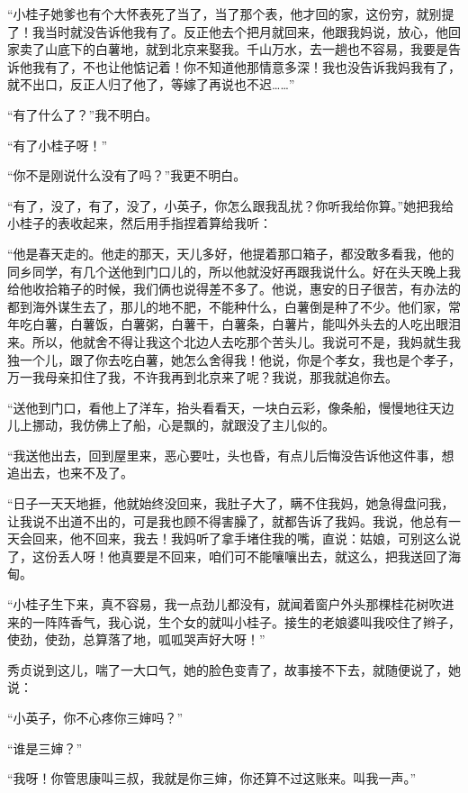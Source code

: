 \par “小桂子她爹也有个大怀表死了当了，当了那个表，他才回的家，这份穷，就别提了！我当时就没告诉他我有了。反正他去个把月就回来，他跟我妈说，放心，他回家卖了山底下的白薯地，就到北京来娶我。千山万水，去一趟也不容易，我要是告诉他我有了，不也让他惦记着！你不知道他那情意多深！我也没告诉我妈我有了，就不出口，反正人归了他了，等嫁了再说也不迟……”
\par “有了什么了？”我不明白。
\par “有了小桂子呀！”
\par “你不是刚说什么没有了吗？”我更不明白。
\par “有了，没了，有了，没了，小英子，你怎么跟我乱扰？你听我给你算。”她把我给小桂子的表收起来，然后用手指捏着算给我听：
\par “他是春天走的。他走的那天，天儿多好，他提着那口箱子，都没敢多看我，他的同乡同学，有几个送他到门口儿的，所以他就没好再跟我说什么。好在头天晚上我给他收拾箱子的时候，我们俩也说得差不多了。他说，惠安的日子很苦，有办法的都到海外谋生去了，那儿的地不肥，不能种什么，白薯倒是种了不少。他们家，常年吃白薯，白薯饭，白薯粥，白薯干，白薯条，白薯片，能叫外头去的人吃出眼泪来。所以，他就舍不得让我这个北边人去吃那个苦头儿。我说可不是，我妈就生我独一个儿，跟了你去吃白薯，她怎么舍得我！他说，你是个孝女，我也是个孝子，万一我母亲扣住了我，不许我再到北京来了呢？我说，那我就追你去。
\par “送他到门口，看他上了洋车，抬头看看天，一块白云彩，像条船，慢慢地往天边儿上挪动，我仿佛上了船，心是飘的，就跟没了主儿似的。
\par “我送他出去，回到屋里来，恶心要吐，头也昏，有点儿后悔没告诉他这件事，想追出去，也来不及了。
\par “日子一天天地捱，他就始终没回来，我肚子大了，瞒不住我妈，她急得盘问我，让我说不出道不出的，可是我也顾不得害臊了，就都告诉了我妈。我说，他总有一天会回来，他不回来，我去！我妈听了拿手堵住我的嘴，直说：姑娘，可别这么说了，这份丢人呀！他真要是不回来，咱们可不能嚷嚷出去，就这么，把我送回了海甸。
\par “小桂子生下来，真不容易，我一点劲儿都没有，就闻着窗户外头那棵桂花树吹进来的一阵阵香气，我心说，生个女的就叫小桂子。接生的老娘婆叫我咬住了辫子，使劲，使劲，总算落了地，呱呱哭声好大呀！”
\par 秀贞说到这儿，喘了一大口气，她的脸色变青了，故事接不下去，就随便说了，她说：
\par “小英子，你不心疼你三婶吗？”
\par “谁是三婶？”
\par “我呀！你管思康叫三叔，我就是你三婶，你还算不过这账来。叫我一声。”
